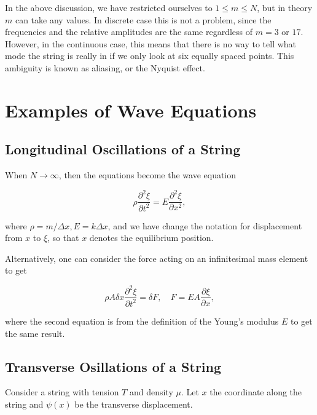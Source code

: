 \documentclass[a4paper,12pt]{report}
\begin{document}

In the above discussion, we have restricted ourselves to \(1 \le m \le N\), but in theory \(m\) can take any values. In discrete case this is not a problem, since the frequencies and the relative amplitudes are the same regardless of \(m = 3 \text { or } 17\). However, in the continuous case, this means that there is no way to tell what mode the string is really in if we only look at six equally spaced points. This ambiguity is known as aliasing, or the Nyquist effect.


\section{Examples of Wave Equations}

\subsection{Longitudinal Oscillations of a String}

When \(N \to \infty\), then the equations become the wave equation 

\begin{equation}
	\rho \frac{\partial^2 \xi }{\partial t^2} = E \frac{\partial^2 \xi }{\partial x^2},   
\end{equation}

where \(\rho = m /\Delta x, E = k \Delta x \), and we have change the notation for displacement from \(x\) to \(\xi \), so that \(x\) denotes the equilibrium position.   

Alternatively, one can consider the force acting on an infinitesimal mass element to get 

\begin{equation}
	\rho A \delta x \frac{\partial^2 \xi }{\partial t^2} = \delta F , \quad F = EA \frac{\partial \xi }{\partial x}, 
\end{equation}

where the second equation is from the definition of the Young's modulus \(E\) to get the same result.


\subsection{Transverse Osillations of a String}

Consider a string with tension \(T\) and density \(\mu \). Let \(x\) the coordinate along the string and \(\psi (x)\) be the transverse displacement.
\end{document}
